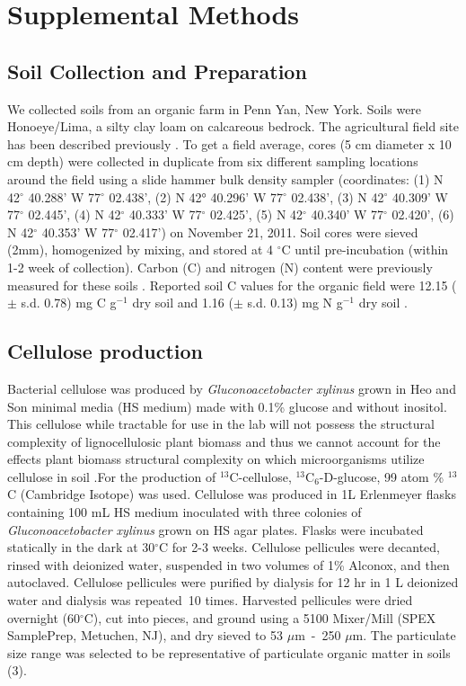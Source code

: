 \documentclass{article}
\begin{document}
\section{Supplemental Methods} 
\subsection{Soil Collection and Preparation} 
We collected soils from an organic farm in Penn Yan, New York. Soils were
Honoeye/Lima, a silty clay loam on calcareous bedrock. The agricultural
field site has been described previously \citep{Berthrong_2013}. To get a field average,
cores (5 cm diameter x 10 cm depth) were collected in duplicate from six
different sampling locations around the field using a slide hammer bulk density
sampler (coordinates: (1) N 42$^{\circ}$ 40.288’ W 77$^{\circ}$ 02.438’, (2)
N 42° 40.296’ W 77$^{\circ}$ 02.438’, (3) N 42$^{\circ}$ 40.309’ W 77$^{\circ}$
02.445’, (4) N 42$^{\circ}$ 40.333’ W 77$^{\circ}$ 02.425’, (5) N 42$^{\circ}$
   40.340’ W 77$^{\circ}$ 02.420’, (6) N 42$^{\circ}$ 40.353’ W 77$^{\circ}$
      02.417’) on November 21,
2011. Soil cores were sieved (2mm), homogenized by mixing, and stored at
      4 $^{\circ}$C until pre-incubation (within 1-2 week of collection).
        Carbon (C) and nitrogen (N) content were previously measured for these
        soils \citep{Berthrong_2013}. Reported soil C values for the organic
        field were
12.15 ($\pm$ s.d. 0.78) mg C g$^{-1}$ dry soil and 1.16 ($\pm$ s.d. 0.13) mg
   N g$^{-1}$ dry soil \citep{Berthrong_2013}. 

\subsection{Cellulose production}
Bacterial cellulose was produced by \textit{Gluconoacetobacter xylinus} grown
in Heo and Son \citep{Heo_2002} minimal media (HS medium) made with 0.1\%
glucose and without inositol. This cellulose while tractable for use in the lab
will not possess the structural complexity of lignocellulosic plant biomass and thus
we cannot account for the effects plant biomass structural complexity on which 
microorganisms utilize cellulose in soil .For the production of $^{13}$C-cellulose,
$^{13}$C$_{6}$-D-glucose, 99 atom \% $^{13}$C (Cambridge Isotope) was used. Cellulose
was produced in 1L Erlenmeyer flasks containing 100 mL HS medium inoculated
with three colonies of \textit{Gluconoacetobacter xylinus} grown on HS agar
plates. Flasks were incubated statically in the dark at 30$^{\circ}$C for 2-3
weeks. Cellulose pellicules were decanted, rinsed with deionized water,
suspended in two volumes of 1\% Alconox, and then autoclaved. Cellulose
pellicules were purified by dialysis for 12 hr in 1 L deionized water and
dialysis was repeated~10 times. Harvested pellicules were dried overnight
(60$^{\circ}$C), cut into pieces, and ground using a 5100 Mixer/Mill (SPEX
SamplePrep, Metuchen, NJ), and dry sieved to 53 $\mu$m - 250 $\mu$m. The particulate
size range was selected to be representative of particulate organic matter in
soils (3).
\end{document}
